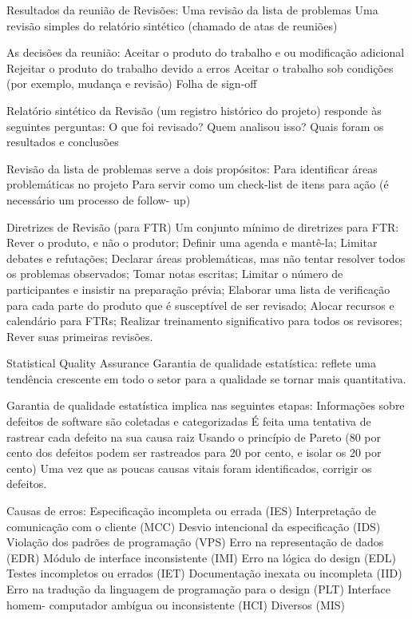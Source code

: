 \documentclass[12pt]{article}
\begin{document}
        Resultados da reunião de Revisões: 
            Uma revisão da lista de problemas 
            Uma revisão simples do relatório sintético (chamado de atas de reuniões) 

        As decisões da reunião: 
            Aceitar o produto do trabalho e ou modificação adicional 
            Rejeitar o produto do trabalho devido a erros 
            Aceitar o trabalho sob condições (por exemplo, mudança e revisão) 
            Folha de sign-off 

        Relatório sintético da Revisão (um registro histórico do projeto) responde às seguintes perguntas: 
            O que foi revisado? 
            Quem analisou isso? 
            Quais foram os resultados e conclusões 

        Revisão da lista de problemas serve a dois propósitos: 
            Para identificar áreas problemáticas no projeto 
            Para servir como um check-list de itens para ação (é necessário um processo de follow- up) 

        Diretrizes de Revisão (para FTR) 
        Um conjunto mínimo de diretrizes para FTR: 
            Rever o produto, e não o produtor; 
            Definir uma agenda e mantê-la; 
            Limitar debates e refutações; 
            Declarar áreas problemáticas, mas não tentar resolver todos os problemas observados;     
            Tomar notas escritas; 
            Limitar o número de participantes e insistir na preparação prévia; 
            Elaborar uma lista de verificação para cada parte do produto que é susceptível de ser revisado; 
            Alocar recursos e calendário para FTRs; 
            Realizar treinamento significativo para todos os revisores; 
            Rever suas primeiras revisões. 

        Statistical Quality Assurance 
            Garantia de qualidade estatística: reflete uma tendência crescente em todo o setor para a qualidade se tornar mais quantitativa. 

        Garantia de qualidade estatística implica nas seguintes etapas: 
            Informações sobre defeitos de software são coletadas e categorizadas 
            É feita uma tentativa de rastrear cada defeito na sua causa raiz 
            Usando o princípio de Pareto (80 por cento dos defeitos podem ser rastreados para 20 por cento, e isolar os 20 por cento) 
            Uma vez que as poucas causas vitais foram identificados, corrigir os defeitos. 

        Causas de erros: 
            Especificação incompleta ou errada (IES) 
            Interpretação de comunicação com o cliente (MCC) 
            Desvio intencional da especificação (IDS) 
            Violação dos padrões de programação (VPS) 
            Erro na representação de dados (EDR) 
            Módulo de interface inconsistente (IMI) 
            Erro na lógica do design (EDL) 
            Testes incompletos ou errados (IET) 
            Documentação inexata ou incompleta (IID) 
            Erro na tradução da linguagem de programação para o design (PLT) 
            Interface homem- computador ambígua ou inconsistente (HCI) 
            Diversos (MIS) 
\end{document}
